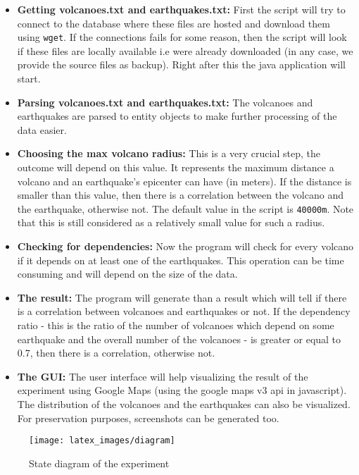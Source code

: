 \documentclass[12pt, a4paper]{article}
\begin{document}
\begin{itemize}
\item {\bf Getting volcanoes.txt and earthquakes.txt:} First the script will try to connect to the database where these files are hosted and download them using \verb|wget|. If the connections fails for some reason, then the script will look if these files are locally available i.e were already downloaded (in any case, we provide the source files as backup). Right after this the java application will start.
\item {\bf Parsing volcanoes.txt and earthquakes.txt:} The volcanoes and earthquakes are parsed to entity objects to make further processing of the data easier.
\item {\bf Choosing the max volcano radius:} This is a very crucial step, the outcome will depend on this value. It represents the maximum distance a volcano and an earthquake's epicenter can have (in meters). If the distance is smaller than this value, then there is a correlation between the volcano and the earthquake, otherwise not. The default value in the script is \verb|40000m|. Note that this is still considered as a relatively small value for such a radius.
\item {\bf Checking for dependencies:} Now the program will check for every volcano if it depends on at least one of the earthquakes. This operation can be time consuming and will depend on the size of the data.
\item {\bf The result:} The program will generate than a result which will tell if there is a correlation between volcanoes and earthquakes or not. If the dependency ratio - this is the ratio of the number of volcanoes which depend on some earthquake and the overall number of the volcanoes - is greater or equal to 0.7, then there is a correlation, otherwise not.
\item {\bf The GUI:} The user interface will help visualizing the result of the experiment using Google Maps (using the google maps v3 api in javascript). The distribution of the volcanoes and the earthquakes can also be visualized. For preservation purposes, screenshots can be generated too. 
\end{itemize}
\begin{figure}[h]
  \centering
    \texttt{[image: latex\_images/diagram]}
    \caption{State diagram of the experiment}
\end{figure}
\end{document}
